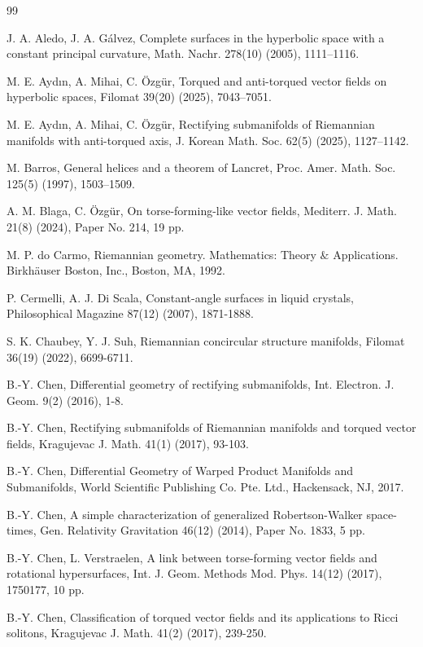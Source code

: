 \documentclass[12pt]{amsart}
\theoremstyle{definition}
\begin{document}
\begin{thebibliography}{99}

 J. A. Aledo, J. A. G\'alvez, Complete surfaces in the hyperbolic space with a constant principal curvature, Math. Nachr. 278(10) (2005), 1111–1116.

 M. E. Aydın, A. Mihai, C. Özgür, Torqued and anti-torqued vector fields on hyperbolic spaces, Filomat 39(20) (2025), 7043–7051.

 M. E. Aydın, A. Mihai, C. Özgür, Rectifying submanifolds of Riemannian manifolds with anti-torqued axis, J. Korean Math. Soc. 62(5) (2025), 1127–1142.

 M. Barros, General helices and a theorem of Lancret, Proc. Amer. Math. Soc. 125(5) (1997), 1503–1509.

 A. M. Blaga, C. Özgür, On torse-forming-like vector fields, Mediterr. J. Math. 21(8) (2024), Paper No. 214, 19 pp.

 M. P. do Carmo, Riemannian geometry.  Mathematics: Theory $\&$ Applications. Birkhäuser Boston, Inc., Boston, MA, 1992. 

 P. Cermelli, A. J. Di Scala, Constant-angle surfaces in liquid crystals, Philosophical Magazine 87(12) (2007), 1871-1888.

 S. K. Chaubey, Y. J. Suh, Riemannian concircular structure manifolds, Filomat 36(19) (2022), 6699-6711.

 B.-Y. Chen, Differential geometry of rectifying submanifolds, Int. Electron. J. Geom.  9(2) (2016), 1-8.

 B.-Y. Chen, Rectifying submanifolds of Riemannian manifolds and torqued vector fields, Kragujevac J. Math. 41(1) (2017), 93-103.

 B.-Y. Chen, Differential Geometry of Warped Product Manifolds and Submanifolds, World Scientific Publishing Co. Pte. Ltd., Hackensack, NJ, 2017.

 B.-Y. Chen, A simple characterization of generalized Robertson-Walker space-times, Gen. Relativity Gravitation 46(12) (2014), Paper No. 1833, 5 pp.

 B.-Y. Chen, L. Verstraelen, A link between torse-forming vector fields and rotational hypersurfaces, Int. J. Geom. Methods Mod. Phys. 14(12) (2017), 1750177, 10 pp.

 B.-Y. Chen, Classification of torqued vector fields and its applications to Ricci solitons, Kragujevac J. Math. 41(2) (2017), 239-250.


\end{thebibliography}
\end{document}
